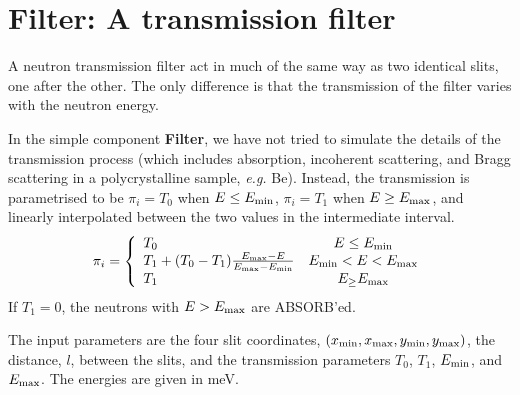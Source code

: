 \section{Filter: A transmission filter}
A neutron transmission filter act in much of the same way as two
identical slits, one after the other.
The only difference is that the transmission of the filter
varies with the neutron energy.

In the simple component {\bf Filter},
we have not tried to simulate the details of the transmission
process (which includes absorption, incoherent scattering,
and Bragg scattering in a polycrystalline sample, {\em e.g.} Be).
Instead, the transmission is parametrised to be
$\pi_i=T_0$ when $E \leq E_{\rm min}$, $\pi_i=T_1$ when $E \geq E_{\rm max}$,
and linearly interpolated between the two values
in the intermediate interval.
\begin{equation}
\pi_i = \left\{ \begin{array}{lc}
 T_0  & E \leq E_{\rm min} \\
 T_1 + (T_0-T_1) \frac{E_{\rm max}-E}{E_{\rm max}-E_{\rm min}}
 & E_{\rm min} < E < E_{\rm max} \\
 T_1  & E_\geq E_{\rm max} \\
\end{array} \right.
\end{equation}
If $T_1=0$, the neutrons with $E>E_{\rm max}$ are ABSORB'ed.

The input parameters are the four slit coordinates, 
$(x_{\rm min}, x_{\rm max}, y_{\rm min}, y_{\rm max})$,
the distance, $l$, between the slits, and the transmission parameters 
$T_0$, $T_1$, $E_{\rm min}$, and $E_{\rm max}$. 
The energies are given in meV.
